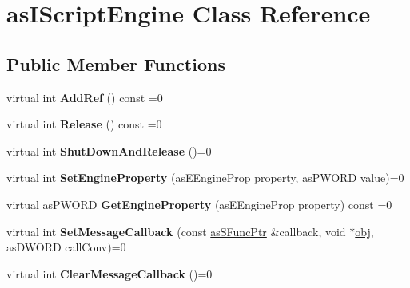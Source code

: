 \hypertarget{classas_i_script_engine}{}\section{as\+I\+Script\+Engine Class Reference}
\label{classas_i_script_engine}
\subsection*{Public Member Functions}
\begin{DoxyCompactItemize}
\item 
\mbox{\label{classas_i_script_engine_aa95a5d9b5d9e7e6a230fedf056eaf8ce}} 
virtual int {\bfseries Add\+Ref} () const =0
\item 
\mbox{\label{classas_i_script_engine_aae91a45da75af9234b87e825b5c08b81}} 
virtual int {\bfseries Release} () const =0
\item 
\mbox{\label{classas_i_script_engine_a28c3800620d4aeaca75d084391eb758e}} 
virtual int {\bfseries Shut\+Down\+And\+Release} ()=0
\item 
\mbox{\label{classas_i_script_engine_a1bce4e5f573a2ca0ff55163e28f761dd}} 
virtual int {\bfseries Set\+Engine\+Property} (as\+E\+Engine\+Prop property, as\+P\+W\+O\+RD value)=0
\item 
\mbox{\label{classas_i_script_engine_a5531bf5310a0c933aa698725a6828e5f}} 
virtual as\+P\+W\+O\+RD {\bfseries Get\+Engine\+Property} (as\+E\+Engine\+Prop property) const =0
\item 
\mbox{\label{classas_i_script_engine_a74192fe950808eb72a64e3e371f0ea02}} 
virtual int {\bfseries Set\+Message\+Callback} (const \hyperlink{structas_s_func_ptr}{as\+S\+Func\+Ptr} \&callback, void $\ast$\hyperlink{structobj}{obj}, as\+D\+W\+O\+RD call\+Conv)=0
\item 
\mbox{\label{classas_i_script_engine_ada64567fc9621e5e98160c7f03efa064}} 
virtual int {\bfseries Clear\+Message\+Callback} ()=0
\item 
\mbox{\label{classas_i_script_engine_a936ce6566af958bb75ba1c0945d8b03a}} 

\end{DoxyCompactItemize}
